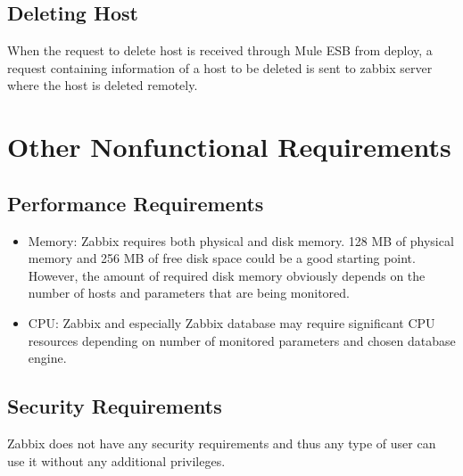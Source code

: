 \documentclass{article}
\begin{document}
\subsection{Deleting Host}

 When the request to delete host is received through Mule ESB from deploy, a request containing information of a host to be deleted is sent to zabbix server where the host is deleted remotely.





\section{Other Nonfunctional Requirements}

\subsection{Performance Requirements}
\begin{itemize}
\item[]Memory:
    Zabbix requires both physical and disk memory. 128 MB of physical memory and 256 MB of free disk space could be a good starting point. However, the amount of required disk memory obviously depends on the number of hosts and parameters that are being monitored.
\item[]CPU:
   Zabbix and especially Zabbix database may require significant CPU resources depending on number of monitored parameters and chosen database engine.
   
 \end{itemize}
\subsection{Security Requirements}
Zabbix does not have any security requirements and thus any type of user can use it without any additional privileges.

\newpage
\appendix
\end{document}
